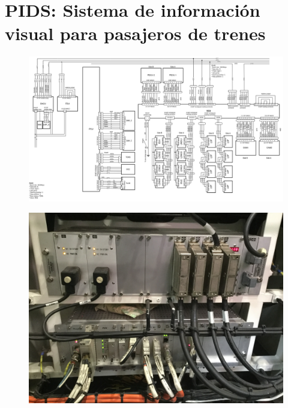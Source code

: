 \pagebreak
\section{PIDS: Sistema de información visual para pasajeros de trenes}

\begin{figure}[ht]
	\centering
	\includegraphics[width=1\textwidth , angle=90]{./Figures/diagramaPIDS.png}
	\caption{}
	\label{fig:diagramaPIDS}
\end{figure}


\begin{figure}[ht]
	\centering
	\includegraphics[width=1\textwidth , angle=90]{./Figures/rackPIDS1.JPG}
	\caption{}
	\label{fig:rackPIDS1}
\end{figure}


